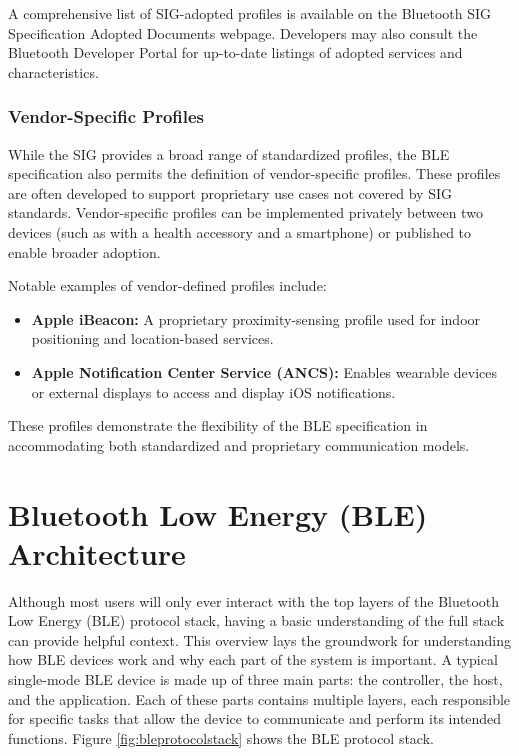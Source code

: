 A comprehensive list of SIG-adopted profiles is available on the Bluetooth SIG Specification Adopted Documents webpage. Developers may also consult the Bluetooth Developer Portal for up-to-date listings of adopted services and characteristics.

\subsubsection{Vendor-Specific Profiles}

While the SIG provides a broad range of standardized profiles, the BLE specification also permits the definition of vendor-specific profiles. These profiles are often developed to support proprietary use cases not covered by SIG standards. Vendor-specific profiles can be implemented privately between two devices (such as with a health accessory and a smartphone) or published to enable broader adoption.

Notable examples of vendor-defined profiles include:

\begin{itemize}
    \item \textbf{Apple iBeacon:} A proprietary proximity-sensing profile used for indoor positioning and location-based services.
    \item \textbf{Apple Notification Center Service (ANCS):} Enables wearable devices or external displays to access and display iOS notifications.
\end{itemize}

These profiles demonstrate the flexibility of the BLE specification in accommodating both standardized and proprietary communication models.

\section{Bluetooth Low Energy (BLE) Architecture}

Although most users will only ever interact with the top layers of the Bluetooth Low Energy (BLE) protocol stack, having a basic understanding of the full stack can provide helpful context. This overview lays the groundwork for understanding how BLE devices work and why each part of the system is important. A typical single-mode BLE device is made up of three main parts: the controller, the host, and the application. Each of these parts contains multiple layers, each responsible for specific tasks that allow the device to communicate and perform its intended functions. Figure \ref{fig:bleprotocolstack} shows the BLE protocol stack.

